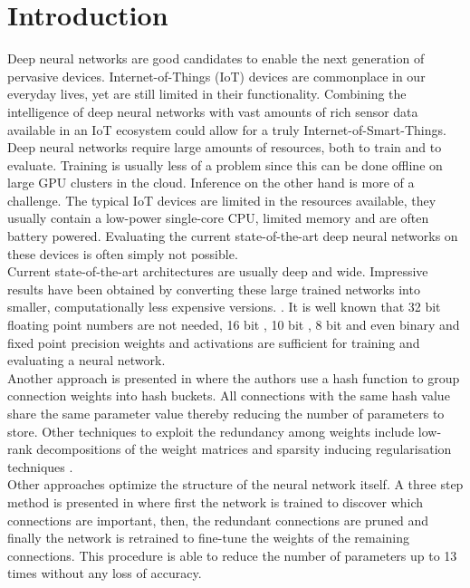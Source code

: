 \documentclass{article}
\begin{document}
\section{Introduction}
\label{introduction}
Deep neural networks are good candidates to enable the next generation of pervasive devices. Internet-of-Things (IoT) devices are commonplace in our everyday lives, yet  are still limited in their functionality. Combining the intelligence of deep neural networks with vast amounts of rich sensor data available in an IoT ecosystem could allow for a truly Internet-of-Smart-Things.
\\
\newline
Deep neural networks require large amounts of resources, both to train and to evaluate. Training is usually less of a problem since this can be done offline on large GPU clusters in the cloud. Inference on the other hand is more of a challenge. The typical IoT devices are limited in the resources available, they usually contain a low-power single-core CPU, limited memory and are often battery powered. Evaluating the current state-of-the-art deep neural networks on these devices is often simply not possible.
\\
\newline
Current state-of-the-art architectures are usually deep and wide. Impressive results have been obtained by converting these large trained networks into smaller, computationally less expensive versions. \cite{ba2014deep, romero2014fitnets}.
\newpage
It is well known that 32 bit floating point numbers are not needed, 16 bit \cite{gupta2015deep}, 10 bit \cite{courbariaux2014training}, 8 bit \cite{vanhoucke2011improving} and even binary \cite{courbariaux2016binarynet} and fixed point precision \cite{lin2015fixed} weights and activations are sufficient for training and evaluating a neural network.
\\
\newline
Another approach is presented in \cite{chen2015compressing} where the authors use a hash function to group connection weights into hash buckets. All connections with the same hash value share the same parameter value thereby reducing the number of parameters to store. Other techniques to exploit the redundancy among weights include low-rank decompositions of the weight matrices \cite{sainath2013low, denil2013predicting, sindhwani2015structured} and sparsity inducing regularisation techniques \cite{collins2014memory}.
\\
\newline
Other approaches optimize the structure of the neural network itself. A three step method is presented in \cite{han2015learning} where first the network is trained to discover which connections are important, then, the redundant connections are pruned and finally the network is retrained to fine-tune the weights of the remaining connections. This procedure is able to reduce the number of parameters up to 13 times without any loss of accuracy.
\end{document}
